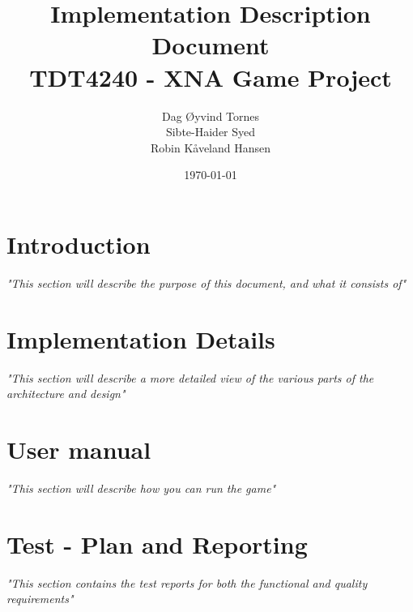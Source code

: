 \documentclass[titlepage,a4paper,11pt]{article}
\date{\today}
\begin{document}
\title{Implementation Description Document\\
 		TDT4240 - XNA Game Project}

\author{Dag Øyvind Tornes\\
 		Sibte-Haider Syed\\ 
		Robin Kåveland Hansen\\}
\maketitle
\newpage
\thispagestyle{empty}
\mbox{}

	
\newpage
\thispagestyle{empty}
\mbox{}

\pagestyle{empty}
\tableofcontents
\clearpage

\pagestyle{fancy}
\rhead{\color{my_color}\Huge\thesection}
\lhead{}
\renewcommand{\headrulewidth}{0pt}

%
%

\pagestyle{empty}

\section{Introduction}
\emph{"This section will describe the purpose of this document, and what it consists of"}
\newpage
	

\section{Implementation Details}
\emph{"This section will describe a more detailed view of the various parts of the architecture and design"}
\newpage
	
	
\section{User manual}
\emph{"This section will describe how you can run the game"}
\newpage
	

\section{Test - Plan and Reporting}
\emph{"This section contains the test reports for both the functional and quality requirements"}
\newpage
	
	
\end{document}
